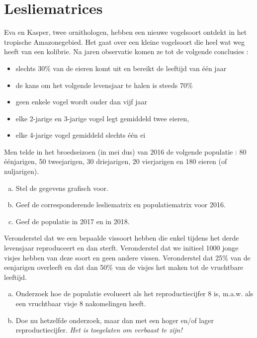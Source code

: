 \documentclass[12pt,twoside]{article}
\begin{document}
\pagebreak
\section{Lesliematrices}

\begin{oefening}
Eva en Kasper, twee ornithologen, hebben een nieuwe vogelsoort ontdekt in het tropische Amazonegebied.  Het gaat over een kleine vogelsoort die heel wat weg heeft van een kolibrie.  Na jaren observatie komen ze tot de volgende conclusies :
\begin{itemize}
  \item slechts 30\% van de eieren komt uit en bereikt de leeftijd van één jaar
  \item de kans om het volgende levensjaar te halen is steeds 70\%
  \item geen enkele vogel wordt ouder dan vijf jaar
  \item elke 2-jarige en 3-jarige vogel legt gemiddeld twee eieren,
  \item elke 4-jarige vogel gemiddeld slechts één ei
\end{itemize}
Men telde in het broedseizoen (in mei dus) van 2016 de volgende populatie :
80 éénjarigen, 50 tweejarigen, 30 driejarigen, 20 vierjarigen en 180 eieren (of nuljarigen).

\begin{enumerate}[(a)]
  \item Stel de gegevens grafisch voor.
  \item Geef de corresponderende lesliematrix en populatiematrix voor 2016.
  \item Geef de populatie in 2017 en in 2018.
\end{enumerate}
\end{oefening}

\begin{oefening}
Veronderstel dat we een bepaalde vissoort hebben die enkel tijdens het derde levensjaar reproduceert en dan sterft. Veronderstel dat we initieel 1000 jonge visjes hebben van deze soort en geen andere vissen. Veronderstel dat 25\% van de eenjarigen overleeft en dat dan 50\% van de visjes het maken tot de vruchtbare leeftijd.
\begin{enumerate}[(a)]
  \item Onderzoek hoe de populatie evolueert als het reproductiecijfer 8 is, m.a.w. als een vruchtbaar visje 8 nakomelingen heeft.
  \item Doe nu hetzelfde onderzoek, maar dan met een hoger en/of lager reproductiecijfer. {\em Het is toegelaten om verbaast te zijn!}
\end{enumerate}
\end{oefening}
\end{document}
